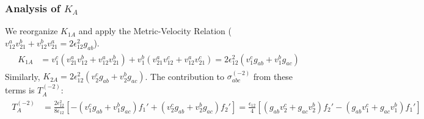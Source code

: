 \documentclass[twocolumn, prx, reprint, amsfonts, amsmath, amssymb, longbibliography, floatfix, aps]{revtex4-2}
\begin{document}
\subsubsection*{Analysis of \texorpdfstring{$K_A$}{KA}}
We reorganize $K_{1A}$ and apply the Metric-Velocity Relation ($v_{12}^a v_{21}^b + v_{12}^b v_{21}^a = 2\epsilon_{12}^2 g_{ab}$).
\begin{align}
\begin{aligned}
K_{1A} &= v_1^c(v_{21}^a v_{12}^b + v_{12}^a v_{21}^b) + v_1^b(v_{21}^a v_{12}^c + v_{12}^a v_{21}^c) = 2\epsilon_{12}^2 (v_1^c g_{ab} + v_1^b g_{ac})
\end{aligned}
\end{align}
Similarly, $K_{2A} = 2\epsilon_{12}^2 (v_2^c g_{ab} + v_2^b g_{ac})$.
The contribution to $\sigma_{abc}^{(-2)}$ from these terms is $T_A^{(-2)}$:
\begin{align}
\begin{aligned}
T_A^{(-2)} &= \frac{2\epsilon_{12}^2}{8\epsilon_{12}} [ -(v_1^c g_{ab} + v_1^b g_{ac}) f_1' + (v_2^c g_{ab} + v_2^b g_{ac}) f_2' ] = \frac{\epsilon_{12}}{4} [ (g_{ab} v_2^c + g_{ac} v_2^b) f_2' - (g_{ab} v_1^c + g_{ac} v_1^b) f_1' ]
\label{TA-2}
\end{aligned}
\end{align}
\end{document}
